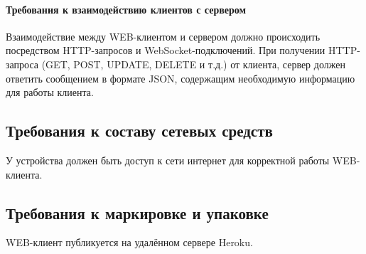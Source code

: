 \paragraph{Требования к взаимодействию клиентов с сервером}
Взаимодействие между WEB-клиентом и сервером должно происходить посредством HTTP-запросов и WebSocket-подключений.
При получении HTTP-запроса (GET, POST, UPDATE, DELETE и т.д.) от клиента, сервер должен ответить сообщением в формате
JSON, содержащим необходимую информацию для работы клиента.

\subsection{Требования к составу сетевых средств}

У устройства должен быть доступ к сети интернет для корректной работы WEB-клиента.

\subsection{Требования к маркировке и упаковке}

WEB-клиент публикуется на удалённом сервере Heroku.